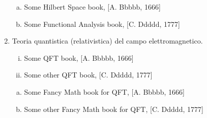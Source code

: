 \begin{enumerate}[I]
\begin{enumerate}[(a)]
\item Some Hilbert Space book, [A. Bbbbb, 1666]
\item Some Functional Analysis book, [C. Ddddd, 1777]
\end{enumerate} 
\item Teoria quantistica (relativistica) del campo elettromagnetico. 
\begin{enumerate}[(i)]
\item Some QFT book, [A. Bbbbb, 1666]
\item Some other QFT book, [C. Ddddd, 1777]
\end{enumerate} 
\begin{enumerate}[(a)]
\item Some Fancy Math book for QFT, [A. Bbbbb, 1666]
\item Some other Fancy Math book for QFT, [C. Ddddd, 1777]
\end{enumerate} 
\end{enumerate} 
 
